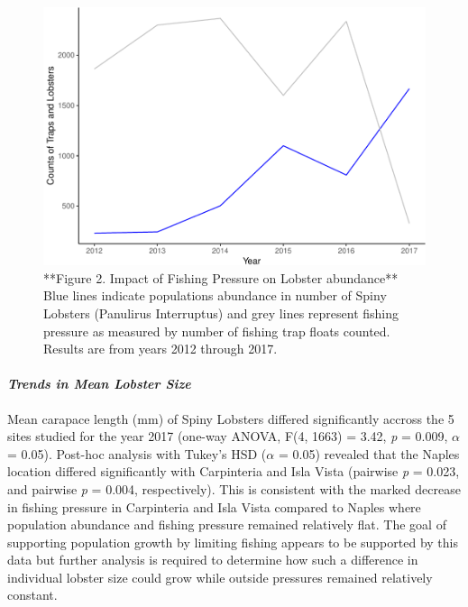 \documentclass[]{article}
\let\oldparagraph\paragraph
\renewcommand{\paragraph}[1]{\oldparagraph{#1}\mbox{}}
\begin{document}
\begin{figure}

{\centering \includegraphics{ESM206_Assignment4_files/figure-latex/unnamed-chunk-3-1} 

}

\caption{**Figure 2. Impact of Fishing Pressure on Lobster abundance** Blue lines indicate populations abundance in number of Spiny Lobsters (Panulirus Interruptus) and grey lines represent fishing pressure as measured by number of fishing trap floats counted. Results are from years 2012 through 2017.}\label{fig:unnamed-chunk-3}
\end{figure}

\paragraph{\texorpdfstring{\emph{Trends in Mean Lobster
Size}}{Trends in Mean Lobster Size}}\label{trends-in-mean-lobster-size}

Mean carapace length (mm) of Spiny Lobsters differed significantly
accross the 5 sites studied for the year 2017 (one-way ANOVA, F(4, 1663)
= 3.42, \emph{p} = 0.009, \(\alpha\) = 0.05). Post-hoc analysis with
Tukey's HSD (\(\alpha\) = 0.05) revealed that the Naples location
differed significantly with Carpinteria and Isla Vista (pairwise
\emph{p} = 0.023, and pairwise \emph{p} = 0.004, respectively). This is
consistent with the marked decrease in fishing pressure in Carpinteria
and Isla Vista compared to Naples where population abundance and fishing
pressure remained relatively flat. The goal of supporting population
growth by limiting fishing appears to be supported by this data but
further analysis is required to determine how such a difference in
individual lobster size could grow while outside pressures remained
relatively constant.
\end{document}
